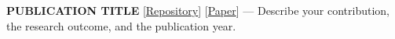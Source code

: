 
\item{\small{\textbf{PUBLICATION TITLE} [\href{https://example.com}{Repository}] [\href{https://example.com}{Paper}] — Describe your contribution, the research outcome, and the publication year.}}
